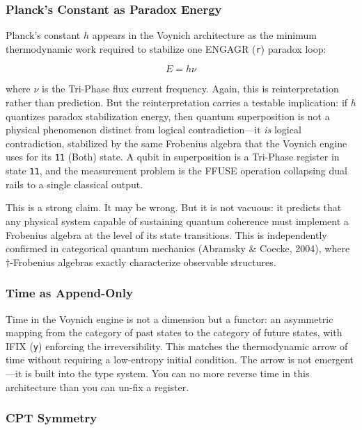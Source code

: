 \documentclass[12pt,a4paper]{article}
\begin{document}
\subsubsection{Planck's Constant as Paradox Energy}

Planck's constant $h$ appears in the Voynich architecture as the minimum thermodynamic work required to stabilize one ENGAGR (\texttt{r}) paradox loop:

\[E = h\nu\]

where $\nu$ is the Tri-Phase flux current frequency. Again, this is reinterpretation rather than prediction. But the reinterpretation carries a testable implication: if $h$ quantizes paradox stabilization energy, then quantum superposition is not a physical phenomenon distinct from logical contradiction---it \emph{is} logical contradiction, stabilized by the same Frobenius algebra that the Voynich engine uses for its \texttt{11} (Both) state. A qubit in superposition is a Tri-Phase register in state \texttt{11}, and the measurement problem is the FFUSE operation collapsing dual rails to a single classical output.

This is a strong claim. It may be wrong. But it is not vacuous: it predicts that any physical system capable of sustaining quantum coherence must implement a Frobenius algebra at the level of its state transitions. This is independently confirmed in categorical quantum mechanics (Abramsky \& Coecke, 2004), where $\dagger$-Frobenius algebras exactly characterize observable structures.

\subsubsection{Time as Append-Only}

Time in the Voynich engine is not a dimension but a functor: an asymmetric mapping from the category of past states to the category of future states, with IFIX (\texttt{y}) enforcing the irreversibility. This matches the thermodynamic arrow of time without requiring a low-entropy initial condition. The arrow is not emergent---it is built into the type system. You can no more reverse time in this architecture than you can un-fix a register.

\subsubsection{CPT Symmetry}
\end{document}
